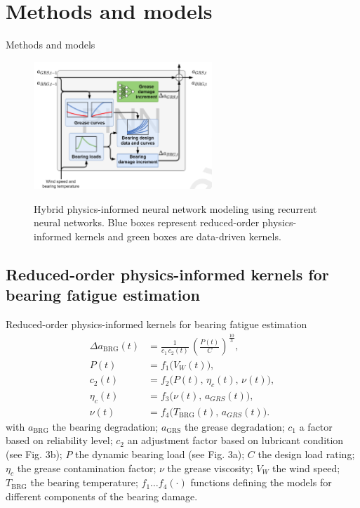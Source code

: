 \documentclass[aspectratio=169,xcolor=dvipsnames]{beamer}
\begin{document}
\section{Methods and models}
\begin{frame}{Methods and models}
    \begin{figure}
        \centering
        \includegraphics[width=0.6\textwidth]{include/PINN.png}
        \label{fig:pinn}
        \caption{Hybrid physics-informed neural network modeling using recurrent neural networks. Blue boxes represent reduced-order physics-informed kernels and green boxes are data-driven kernels. \cite{YUCESAN2023110921}}
    \end{figure}
\end{frame}

\subsection{Reduced-order physics-informed kernels for bearing fatigue estimation}
\begin{frame}{Reduced-order physics-informed kernels for bearing fatigue estimation}
    \begin{align}
    \Delta a_{\mathrm{BRG}}(t)
    &= \frac{1}{c_1\,c_2(t)}\, \left(\frac{P(t)}{C}\right)^{\frac{10}{3}}, \\[4pt]
    P(t) &= f_1\big(V_W(t)\big), \\[4pt]
    c_2(t) &= f_2\big(P(t),\,\eta_c(t),\,\nu(t)\big), \\[4pt]
    \eta_c(t) &= f_3\big(\nu(t),\,a_{GRS}(t)\big), \\[4pt]
    \nu(t) &= f_4\big(T_{\mathrm{BRG}}(t),\,a_{GRS}(t)\big).
    \end{align}
    with $a_{\mathrm{BRG}}$ the bearing degradation; $a_{\mathrm{GRS}}$ the grease degradation; $c_1$ a factor based on reliability level; $c_2$ an adjustment factor based on lubricant condition (see Fig. 3b); $P$ the dynamic bearing load (see Fig. 3a); $C$ the design load rating; $\eta_c$ the grease contamination factor; $\nu$ the grease viscosity; $V_W$ the wind speed; $T_{\mathrm{BRG}}$ the bearing temperature; $f_1\ldots f_4(\cdot)$ functions defining the models for different components of the bearing damage.
\end{frame}
\end{document}
